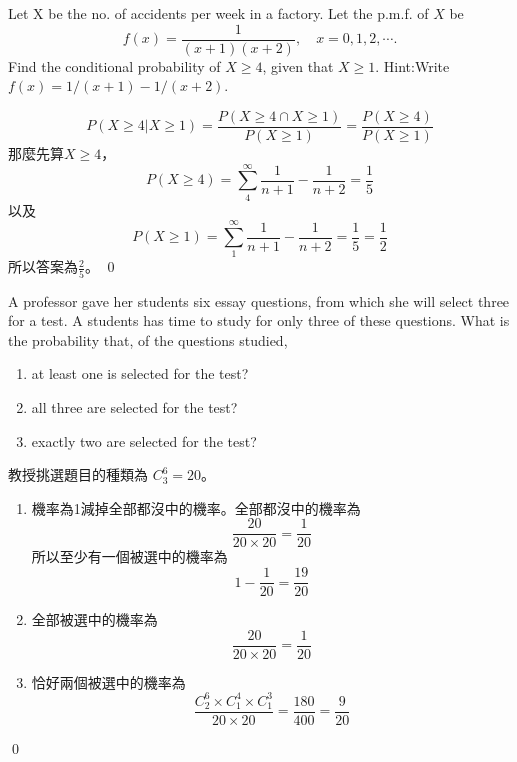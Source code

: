 \begin{exercise}[2.1-13]
    Let X be the no. of accidents per week in a factory. Let the p.m.f.
    of $X$ be
    $$
    f(x)=\frac{1}{(x+1)(x+2)},\quad x=0,1,2,\cdots.
    $$
    Find the conditional probability of $X\geq4$, given that $X\geq1$.
    Hint:Write $f(x)=1/(x+1)-1/(x+2)$.
\end{exercise}
\begin{solution}
    $$
    P(X\geq4|X\geq1)=\frac{P(X\geq4\cap X\geq1)}{P(X\geq1)}=\frac{P(X\geq4)}{P(X\geq1)}
    $$
    那麼先算$X\geq4$，
    $$
    P(X\geq4)=\sum^\infty_4 \frac{1}{n+1}-\frac{1}{n+2}=\frac{1}{5}
    $$
    以及
    $$
    P(X\geq1)=\sum^\infty_1 \frac{1}{n+1}-\frac{1}{n+2}=\frac{1}{5}=\frac{1}{2}
    $$
    所以答案為$\frac{2}{5}$。
    \qed
\end{solution}
\begin{exercise}[2.1-15]
    A professor gave her students six essay questions, from which she will select three for a test. A students has time to study for only three of these questions. 
    What is the probability that, of the questions studied,
    \begin{enumerate}
        \item at least one is selected for the test?
        \item all three are selected for the test?
        \item exactly two are selected for the test?
    \end{enumerate}
\end{exercise}
\begin{solution}
    教授挑選題目的種類為 $C^6_3=20$。
\begin{enumerate}
    \item 機率為1減掉全部都沒中的機率。全部都沒中的機率為
    $$
    \frac{20}{20\times 20}=\frac{1}{20}
    $$
    所以至少有一個被選中的機率為
    $$
    1-\frac{1}{20}=\frac{19}{20}
    $$
    \item 全部被選中的機率為
    $$
    \frac{20}{20\times 20}=\frac{1}{20}
    $$
    \item 恰好兩個被選中的機率為
    $$
    \frac{C^6_2\times C^4_1\times C^3_1}{20 \times 20}=\frac{180}{400}=\frac{9}{20}
    $$
\end{enumerate}
    \qed
\end{solution}
